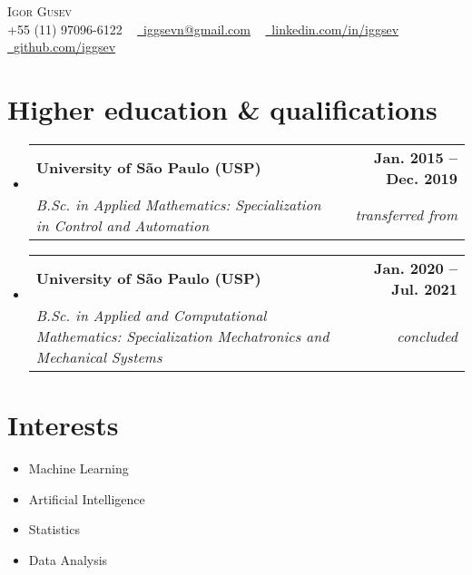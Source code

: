 \documentclass[letterpaper,11pt]{article}
\makeatletter
\newcommand{\resumeSubheading}[4]{
  \vspace{-2pt}\item
    \begin{tabular*}{1.0\textwidth}[t]{l@{\extracolsep{\fill}}r}
      \textbf{#1} & \textbf{\small #2} \\
      \textit{\small#3} & \textit{\small #4} \\
    \end{tabular*}\vspace{-7pt}
}
\newcommand{\resumeSubHeadingListStart}{\begin{itemize}[leftmargin=0.0in, label={}]}
\newcommand{\resumeSubHeadingListEnd}{\end{itemize}}
\makeatother
\begin{document}



\begin{center}
    {\Huge \scshape Igor Gusev} \\ \vspace{1pt} +55 (11) 97096-6122 ~ \href{iggsevn@gmail.com}{\raisebox{-0.2\height}\faEnvelope\  \underline{iggsevn@gmail.com}} ~ 
    \href{https://linkedin.com/in//}{\raisebox{-0.2\height}\faLinkedin\ \underline{linkedin.com/in/iggsev}}  ~
    \href{https://github.com/}{\raisebox{-0.2\height}\faGithub\ \underline{github.com/iggsev}}
    \vspace{-8pt}
\end{center}
\vspace{0.5cm}
\section{Higher education \& qualifications}
  \resumeSubHeadingListStart
    \resumeSubheading
      {University of São Paulo (USP)}{Jan. 2015 -- Dec. 2019}
      {B.Sc. in Applied Mathematics: Specialization in Control and Automation}{transferred from}
    \resumeSubheading
      {University of São Paulo (USP)}{Jan. 2020 -- Jul. 2021}
      {B.Sc. in Applied and Computational Mathematics: Specialization Mechatronics and Mechanical Systems}{concluded}
      
  \resumeSubHeadingListEnd

\vspace{0.5cm}
\section{Interests}
        \begin{multicols}{4}
            \begin{itemize}[itemsep=-5pt, parsep=3pt]
                \item Machine Learning
                \item Artificial Intelligence 
                \item Statistics
                \item Data Analysis
            \end{itemize}
        \end{multicols}
        \vspace*{2.0\multicolsep}
\end{document}

